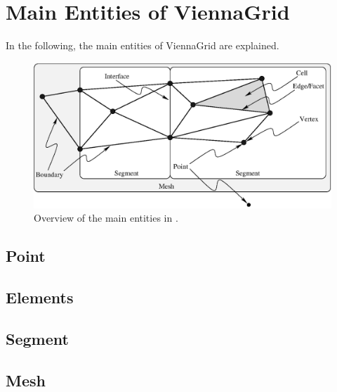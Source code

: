 \chapter{Main Entities of ViennaGrid} \label{chap:entities}


In the following, the main entities of ViennaGrid are explained. 

\begin{figure}[tb]
 \includegraphics{figures/entities.eps}
 \caption{Overview of the main entities in \ViennaGrid.}
 \label{fig:entities}
\end{figure}


\section{Point}


\section{Elements}


\section{Segment}


\section{Mesh}
